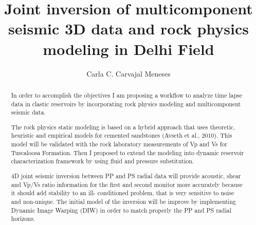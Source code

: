 \documentclass[letterpaper,12pt]{article}
\title{Joint inversion of multicomponent seismic 3D data and rock physics modeling in Delhi Field}
\author{Carla C. Carvajal Meneses}
\begin{document}
\frontmatter

\maketitle
\newpage

\makecopyright{\the\year}
\newpage


\makesubmittal
\newpage


\begin{abstract}
In order to accomplish the objectives I am proposing a workflow to analyze
  time lapse data in clastic reservoirs by incorporating rock physics modeling
 and multicomponent seismic data.
   
The rock physics static modeling is based on a hybrid  approach that uses theoretic,
 heuristic and empirical models for cemented sandstones (Avseth et al., 2010). 
This model will be validated with the rock laboratory measurements of Vp and Vs for
 Tuscaloosa Formation.  Then I proposed to extend the modeling into dynamic reservoir 
 characterization framework by using fluid and pressure substitution.

4D joint seismic inversion between PP and PS radial data will provide acoustic, shear 
and Vp/Vs ratio information for the first and second monitor more accurately because it 
should add stability to an ill- conditioned problem, that is very sensitive to noise and non-unique.
The initial model of the inversion will be improve by implementing  Dynamic Image Warping
 (DIW) in order to match properly the PP and PS radial horizons.


\end{abstract}

\newpage


\tableofcontents

\newpage

\listoffiguresandtables

\newpage

\listofsymbols

\newpage

\end{document}
